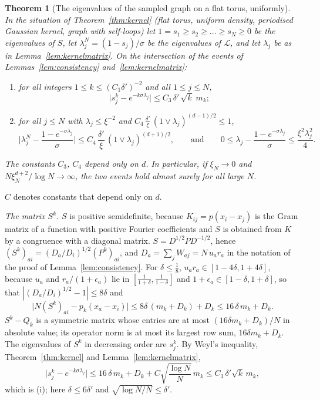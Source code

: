 \documentclass[11pt,a4paper]{article}
\makeatletter
\theoremstyle{stmt}
\newtheorem{theorem}{Theorem}[section]
\theoremstyle{defn}
\theoremstyle{rmk}
\renewenvironment{proof}[1][\proofname]{\par\pushQED{\qed}\normalfont\topsep6\p@\@plus6\p@\relax
  \trivlist\item[\hskip\labelsep{\sffamily\itshape\small #1.}]\ignorespaces}{\popQED\endtrivlist\@endpefalse}
\numberwithin{equation}{section}
\newcommand{\Lc}{\mathcal{L}}
\makeatother
\begin{document}
{\begin{theorem}[The eigenvalues of the sampled graph on a flat torus, uniformly]\label{thm:eigtorus}
In the situation of Theorem~\ref{thm:kernel} (flat torus, uniform density, periodised Gaussian kernel, graph with self-loops) let $1=s_1\ge s_2\ge\dots\ge s_N\ge0$ be the eigenvalues of $S$, let $\lambda^N_j=(1-s_j)/\sigma$ be the eigenvalues of $\Lc$, and let $\lambda_j$ be as in Lemma~\ref{lem:kernelmatrix}. On the intersection of the events of Lemmas~\ref{lem:consistency} and~\ref{lem:kernelmatrix}:
\begin{enumerate}[label=\textup{(\roman*)}]
\item for all integers $1\le k\le(C_1\delta')^{-2}$ and all $1\le j\le N$,
\[
\big|s_j^k-e^{-k\sigma\lambda_j}\big|\le C_3\,\delta'\,\sqrt k\;m_k ;
\]
\item for all $j\le N$ with $\lambda_j\le\xi^{-2}$ and $C_4\,\frac{\delta'}{\xi}\,(1\vee\lambda_j)^{(d-1)/2}\le1$,
\[
\Big|\lambda^N_j-\frac{1-e^{-\sigma\lambda_j}}{\sigma}\Big|\le C_4\,\frac{\delta'}{\xi}\,(1\vee\lambda_j)^{(d+1)/2},\qquad\text{and}\qquad0\le\lambda_j-\frac{1-e^{-\sigma\lambda_j}}{\sigma}\le\frac{\xi^2\lambda_j^2}{4}.
\]
\end{enumerate}
The constants $C_3$, $C_4$ depend only on $d$. In particular, if $\xi_N\to0$ and $N\xi_N^{d+2}/\log N\to\infty$, the two events hold almost surely for all large $N$.
\end{theorem}

\begin{proof}
$C$ denotes constants that depend only on $d$.

\emph{The matrix $S^k$.} $S$ is positive semidefinite, because $K_{ij}=p(x_i-x_j)$ is the Gram matrix of a function with positive Fourier coefficients and $S$ is obtained from $K$ by a congruence with a diagonal matrix. $S=D^{1/2}PD^{-1/2}$, hence $(S^k)_{ai}=(D_a/D_i)^{1/2}(P^k)_{ai}$, and $D_a=\sum_jW_{aj}=N\,u_ar_a$ in the notation of the proof of Lemma~\ref{lem:consistency}. For $\delta\le\frac18$, $u_ar_a\in[1-4\delta,1+4\delta]$, because $u_a$ and $r_a/(1+\epsilon_a)$ lie in $[\frac1{1+\delta},\frac1{1-\delta}]$ and $1+\epsilon_a\in[1-\delta,1+\delta]$, so that $|(D_a/D_i)^{1/2}-1|\le8\delta$ and
\[
\big|N(S^k)_{ai}-p_k(x_a-x_i)\big|\le8\delta\,(m_k+D_k)+D_k\le16\,\delta\,m_k+D_k .
\]
$S^k-Q_k$ is a symmetric matrix whose entries are at most $(16\delta m_k+D_k)/N$ in absolute value; its operator norm is at most its largest row sum, $16\delta m_k+D_k$. The eigenvalues of $S^k$ in decreasing order are $s_j^k$. By Weyl's inequality, Theorem~\ref{thm:kernel} and Lemma~\ref{lem:kernelmatrix},
\[
\big|s_j^k-e^{-k\sigma\lambda_j}\big|\le16\,\delta\,m_k+D_k+C\sqrt{\frac{\log N}{N}}\,m_k\le C_3\,\delta'\sqrt k\,m_k ,
\]
which is (i); here $\delta\le6\delta'$ and $\sqrt{\log N/N}\le\delta'$.


\end{proof}}
\end{document}
